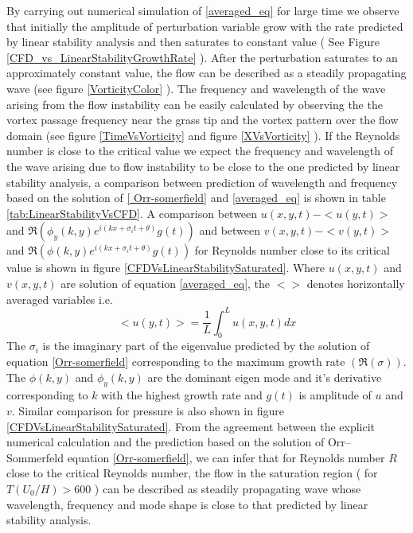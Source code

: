 \documentclass[12pt]{report}   %
\begin{document}
By carrying out numerical simulation of \eqref{averaged_eq} for large time we observe that initially the amplitude of perturbation variable grow with the rate predicted by linear stability analysis and then saturates to constant value (  See Figure \ref{CFD_vs_LinearStabilityGrowthRate} ). After the perturbation saturates to an approximately constant value, the flow can be described as a steadily propagating wave (see figure \ref{VorticityColor} ). The frequency and wavelength of the wave arising from the flow instability can be easily calculated by observing the the vortex passage frequency near the grass tip and the vortex pattern over the flow domain (see figure \ref{TimeVsVorticity} and figure \ref{XVsVorticity} ). If the Reynolds number is close to the critical value we expect the frequency and wavelength of the wave arising due to flow instability to be close to the one predicted by linear stability analysis, a comparison between prediction of wavelength and frequency based on the solution of \eqref{
Orr-somerfield} and \eqref{averaged_eq} is shown in table \ref{tab:LinearStabilityVsCFD}. A comparison between $u(x,y,t)-<u(y,t)>$ and 
 $\Re\left(\phi_y(k,y) e^{i\left(kx+\sigma_i t+ \theta\right)} g(t) \right)$  and between $v(x,y,t)-<v(y,t)>$ and $\Re\left(\phi(k,y) e^{i\left(kx+\sigma_i t+ \theta\right)} g(t) \right)$ for Reynolds number close to its critical value is shown in figure \ref{CFDVsLinearStabilitySaturated}. Where $u(x,y,t)$ and $v(x,y,t)$ are solution of equation \eqref{averaged_eq}, the $< >$ denotes horizontally averaged variables i.e.
 \[<u(y,t)> = \frac{1}{L}\int_{0}^{L} u(x,y,t) dx\]
 The $\sigma_i$ is the imaginary part of the eigenvalue predicted by the solution of equation \ref{Orr-somerfield} corresponding to the maximum growth rate $(\Re(\sigma))$. The $\phi(k,y)$ and $\phi_y(k,y)$ are the dominant eigen mode and it's derivative corresponding to $k$ with the highest growth rate and $g(t)$ is amplitude of $u$ and $v$. Similar comparison for pressure is also shown in figure \ref{CFDVsLinearStabilitySaturated}. From the agreement between the explicit numerical calculation and the prediction based on the solution of Orr–Sommerfeld equation \ref{Orr-somerfield}, we can infer that for Reynolds number $R$ close to the critical Reynolds number, the flow in the saturation region ( for $T(U_0/H)>600$ ) can be described as steadily propagating wave whose wavelength, frequency and mode shape is close to that predicted by linear stability analysis.  
\end{document}
